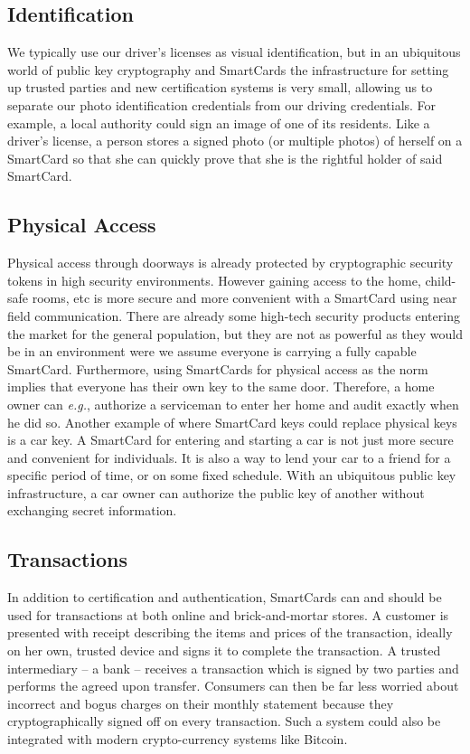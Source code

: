 \documentclass[11pt, twocolumn]{article}
\begin{document}
\subsection{Identification}

We typically use our driver's licenses as visual identification, but
in an ubiquitous world of public key cryptography and SmartCards the
infrastructure for setting up trusted parties and new certification
systems is very small, allowing us to separate our photo
identification credentials from our driving credentials. For example,
a local authority could sign an image of one of its residents. Like a
driver's license, a person stores a signed photo (or multiple photos)
of herself on a SmartCard so that she can quickly prove that she is
the rightful holder of said SmartCard.

\subsection{Physical Access}

Physical access through doorways is already protected by cryptographic
security tokens in high security environments. However gaining access
to the home, child-safe rooms, etc is more secure and more convenient
with a SmartCard using near field communication. There are already
some high-tech security products entering the market for the general
population, but they are not as powerful as they would be in an
environment were we assume everyone is carrying a fully capable
SmartCard. Furthermore, using SmartCards for physical access as the
norm implies that everyone has their own key to the same
door. Therefore, a home owner can \textit{e.g.}, authorize a
serviceman to enter her home and audit exactly when he did so. Another
example of where SmartCard keys could replace physical keys is a car
key. A SmartCard for entering and starting a car is not just more
secure and convenient for individuals. It is also a way to lend your
car to a friend for a specific period of time, or on some fixed
schedule. With an ubiquitous public key infrastructure, a car owner
can authorize the public key of another without exchanging secret
information.

\subsection{Transactions}

In addition to certification and authentication, SmartCards can and
should be used for transactions at both online and brick-and-mortar
stores. A customer is presented with receipt describing the items and
prices of the transaction, ideally on her own, trusted device and
signs it to complete the transaction. A trusted intermediary -- a bank
-- receives a transaction which is signed by two parties and performs
the agreed upon transfer. Consumers can then be far less worried about
incorrect and bogus charges on their monthly statement because they
cryptographically signed off on every transaction. Such a system could
also be integrated with modern crypto-currency systems like Bitcoin.
\end{document}
